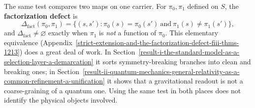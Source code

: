 \documentclass[11pt]{article}
\newcommand{\Deltafact}{\Delta_{\mathrm{fact}}}
\theoremstyle{definition}
\begin{document}
The same test compares two maps on one carrier. For \(\pi_0,\pi_1\) defined on \(S\), the \textbf{factorization
defect} is
\[
\Deltafact(\pi_0,\pi_1)=\{(s,s') : \pi_0(s)=\pi_0(s')\ \text{and}\ \pi_1(s)\neq\pi_1(s')\},
\]
and \(\Deltafact\neq\varnothing\) exactly when \(\pi_1\) is \emph{not} a function of \(\pi_0\). This elementary
equivalence (Appendix~\ref{strict-extension-and-the-factorization-defect-fiii-thms-1213}) does a great deal of work.
In Section~\ref{result-i-the-standard-model-as-a-selection-layer-a-demarcation} it sorts symmetry-breaking branches into
clean and breaking ones; in Section~\ref{result-ii-quantum-mechanics-general-relativity-as-a-common-refinement-a-unification}
it shows that a gravitational readout is not a coarse-graining of a quantum one. Using the same test in both places does
not identify the physical objects involved.
\end{document}
